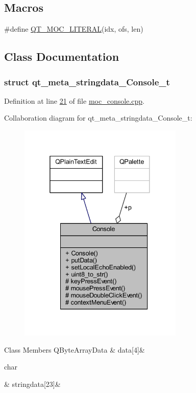 \subsection*{Macros}
\begin{DoxyCompactItemize}
\item 
\#define \hyperlink{a00064_a75bb9482d242cde0a06c9dbdc6b83abe}{Q\+T\+\_\+\+M\+O\+C\+\_\+\+L\+I\+T\+E\+R\+A\+L}(idx, ofs, len)
\end{DoxyCompactItemize}


\subsection{Class Documentation}
\label{d6/daa/a00187}
\hypertarget{a00064_d6/daa/a00187}{}
\subsubsection{struct qt\+\_\+meta\+\_\+stringdata\+\_\+\+Console\+\_\+t}


Definition at line \hyperlink{a00064_source_l00021}{21} of file \hyperlink{a00064_source}{moc\+\_\+console.\+cpp}.



Collaboration diagram for qt\+\_\+meta\+\_\+stringdata\+\_\+\+Console\+\_\+t\+:
\nopagebreak
\begin{figure}[H]
\begin{center}
\leavevmode
\includegraphics[width=222pt]{dd/dfe/a00283}
\end{center}
\end{figure}
\begin{DoxyFields}{Class Members}
\hypertarget{a00064_af7131d57b034ad13a178d273cfee74c2}{Q\+Byte\+Array\+Data}\label{a00064_af7131d57b034ad13a178d273cfee74c2}
&
data\mbox{[}4\mbox{]}&
\\
\hline

\hypertarget{a00064_a63ab346e732e08dad62cdef78b05d53d}{char}\label{a00064_a63ab346e732e08dad62cdef78b05d53d}
&
stringdata\mbox{[}23\mbox{]}&
\\
\hline

\end{DoxyFields}


